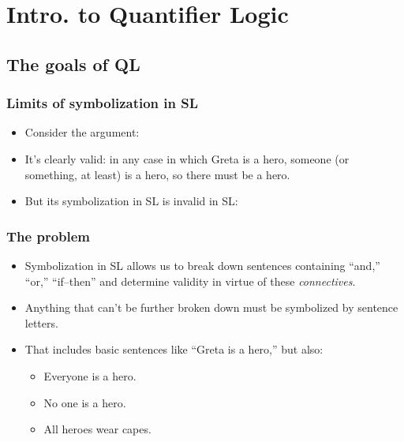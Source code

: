 ﻿%

\setcounter{section}{7}

\section{Intro. to Quantifier Logic}

\begin{frame}

\scriptsize{\tableofcontents}

\end{frame}

\subsection{The goals of QL}

\begin{frame}
  \frametitle{Limits of symbolization in SL}

\begin{itemize}[<+->]
  \item Consider the argument:
  \item It's clearly valid: in any case in which Greta is a hero,
  someone (or something, at least) is a hero, so there must be a hero.
  \item But its symbolization in SL is invalid in SL:
\end{itemize}
\end{frame}

\begin{frame}
  \frametitle{The problem}

  \begin{itemize}[<+->]
    \item Symbolization in SL allows us to break down sentences
    containing ``and,'' ``or,'' ``if--then'' and determine validity in
    virtue of these \emph{connectives}.
    \item Anything that can't be further broken down must be
    symbolized by sentence letters.
    \item That includes basic sentences like ``Greta is a hero,'' but also:
    \begin{itemize}
      \item Everyone is a hero.
      \item No one is a hero.
      \item All heroes wear capes.
    \end{itemize}
  \end{itemize}
\end{frame}

